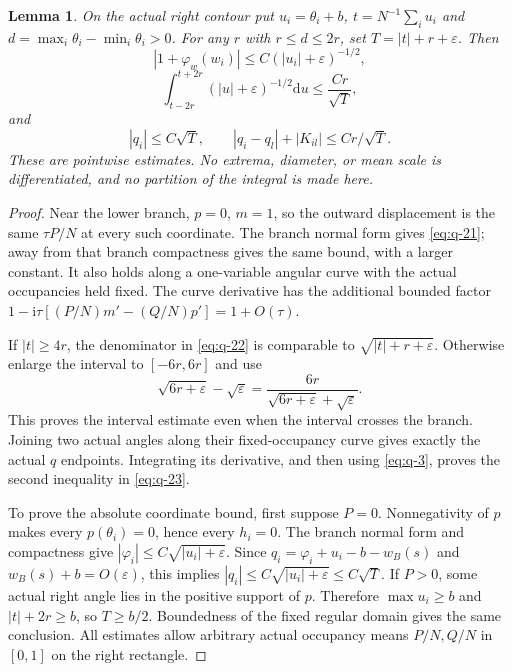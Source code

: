 \documentclass[11pt]{article}
\numberwithin{equation}{section}
\newtheorem{lemma}[theorem]{Lemma}
\theoremstyle{remark}\newtheorem{remark}[theorem]{Remark}
\newcommand{\ii}{\mathrm i}
\newcommand{\dd}{\mathrm d}
\begin{document}
\begin{lemma}\label{lem:coordinate-scale}
On the actual right contour put
$u_i=\theta_i+b$, $t=N^{-1}\sum_i u_i$ and
$d=\max_i\theta_i-\min_i\theta_i>0$.
For any $r$ with $r\le d\le2r$, set $T=|t|+r+\varepsilon$.
Then
\begin{equation}\label{eq:q-21}
 |1+\varphi_w(w_i)|\le C(|u_i|+\varepsilon)^{-1/2},
\end{equation}
\begin{equation}\label{eq:q-22}
 \int_{t-2r}^{t+2r}(|u|+\varepsilon)^{-1/2}\dd u
       \le\frac{Cr}{\sqrt T},
\end{equation}
and
\begin{equation}\label{eq:q-23}
 |q_i|\le C\sqrt T,\qquad
 |q_i-q_l|+|K_{il}|\le Cr/\sqrt T.
\end{equation}
These are pointwise estimates. No extrema, diameter, or mean scale
is differentiated, and no partition of the integral is made here.
\end{lemma}
\begin{proof}
Near the lower branch, $p=0$, $m=1$, so the outward displacement
is the same $\tau P/N$ at every such coordinate. The branch normal
form gives \eqref{eq:q-21}; away from that branch compactness gives
the same bound, with a larger constant. It also holds along a
one-variable angular curve with the actual occupancies held fixed.
The curve derivative has the additional bounded factor
$1-\ii\tau[(P/N)m'-(Q/N)p']=1+O(\tau)$.

If $|t|\ge4r$, the denominator in \eqref{eq:q-22} is comparable
to $\sqrt{|t|+r+\varepsilon}$. Otherwise enlarge the interval to
$[-6r,6r]$ and use
\[
 \sqrt{6r+\varepsilon}-\sqrt\varepsilon
 =\frac{6r}{\sqrt{6r+\varepsilon}+\sqrt\varepsilon}.
\]
This proves the interval estimate even when the interval crosses
the branch. Joining two actual angles along their fixed-occupancy
curve gives exactly the actual $q$ endpoints. Integrating its
derivative, and then using \eqref{eq:q-3}, proves the second
inequality in \eqref{eq:q-23}.

To prove the absolute coordinate bound, first suppose $P=0$.
Nonnegativity of $p$ makes every $p(\theta_i)=0$, hence every
$h_i=0$. The branch normal form and compactness give
$|\varphi_i|\le C\sqrt{|u_i|+\varepsilon}$.
Since $q_i=\varphi_i+u_i-b-w_B(s)$ and
$w_B(s)+b=O(\varepsilon)$, this implies
$|q_i|\le C\sqrt{|u_i|+\varepsilon}\le C\sqrt T$.
If $P>0$, some actual right angle lies in the positive support
of $p$. Therefore $\max u_i\ge b$ and $|t|+2r\ge b$, so
$T\ge b/2$. Boundedness of the fixed regular domain gives the
same conclusion. All estimates allow arbitrary actual occupancy
means $P/N,Q/N$ in $[0,1]$ on the right rectangle.
\end{proof}
\end{document}
